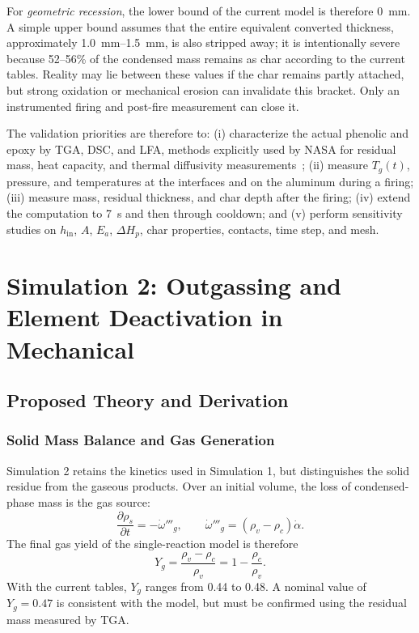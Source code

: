 \documentclass[oneside,openany]{amsdtx}
\newcommand{\pd}{\partial}
\begin{document}
For \emph{geometric recession}, the lower bound of the current model is
therefore \SI{0}{mm}. A simple upper bound assumes that the entire equivalent
converted thickness, approximately \SIrange{1.0}{1.5}{mm}, is also stripped
away; it is intentionally severe because 52--56\% of the condensed mass
remains as char according to the current tables. Reality may lie between these
values if the char remains partly attached, but strong oxidation or mechanical
erosion can invalidate this bracket. Only an instrumented firing and post-fire
measurement can close it.

The validation priorities are therefore to: (i) characterize the actual
phenolic and epoxy by TGA, DSC, and LFA, methods explicitly used by NASA for
residual mass, heat capacity, and thermal diffusivity
measurements~\cite{nasa-testing}; (ii) measure \(T_g(t)\), pressure, and
temperatures at the interfaces and on the aluminum during a firing; (iii)
measure mass, residual thickness, and char depth after the firing; (iv) extend
the computation to \SI{7}{s} and then through cooldown; and (v) perform
sensitivity studies on \(h_\mathrm{in}\), \(A\), \(E_a\), \(\Delta H_p\), char
properties, contacts, time step, and mesh.

\clearpage
\section{Simulation 2: Outgassing and Element Deactivation in Mechanical}

\subsection{Proposed Theory and Derivation}

\subsubsection{Solid Mass Balance and Gas Generation}

Simulation 2 retains the kinetics used in Simulation 1, but distinguishes the
solid residue from the gaseous products. Over an initial volume, the loss of
condensed-phase mass is the gas source:
\begin{equation}
  \frac{\pd\rho_s}{\pd t}=-\dot\omega'''_g,
  \qquad
  \dot\omega'''_g=(\rho_v-\rho_c)\dot\alpha.
  \label{eq:solid-mass-sim2}
\end{equation}
The final gas yield of the single-reaction model is therefore
\begin{equation}
  Y_g=\frac{\rho_v-\rho_c}{\rho_v}=1-\frac{\rho_c}{\rho_v}.
  \label{eq:gas-yield}
\end{equation}
With the current tables, \(Y_g\) ranges from 0.44 to 0.48. A nominal value of
\(Y_g=0.47\) is consistent with the model, but must be confirmed using the
residual mass measured by TGA.
\end{document}
